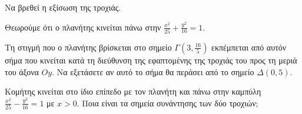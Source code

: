 \begin{alist}
    \item Να βρεθεί η εξίσωση της τροχιάς. 
    \item Θεωρούμε ότι ο πλανήτης κινείται πάνω στην $\frac{x^2}{25} + \frac{y^2}{16} = 1$.
    \begin{rlist}
        \item Τη στιγμή που ο πλανήτης βρίσκεται στο σημείο $\Gamma\left(3,\frac{16}{5}\right)$ εκπέμπεται από αυτόν σήμα που κινείται κατά τη διεύθυνση της εφαπτομένης της τροχιάς του προς τη μεριά του άξονα $Oy$. Να εξετάσετε αν αυτό το σήμα θα περάσει από το σημείο $\Delta(0,5)$. 
        \item Κομήτης κινείται στο ίδιο επίπεδο με τον πλανήτη και πάνω στην καμπύλη $\frac{x^2}{25} - \frac{y^2}{16} = 1$ με $x > 0$. Ποια είναι τα σημεία συνάντησης των δύο τροχιών; 
    \end{rlist}
\end{alist}